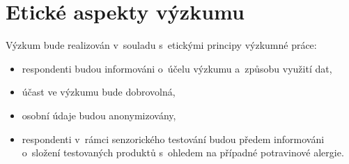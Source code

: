 \section{Etické aspekty výzkumu}
\label{sec:meth_ethics}

Výzkum bude realizován v~souladu s~etickými principy výzkumné práce:
\begin{itemize}
  \item respondenti budou informováni o~účelu výzkumu a~způsobu využití dat,
  \item účast ve výzkumu bude dobrovolná,
  \item osobní údaje budou anonymizovány,
  \item respondenti v~rámci senzorického testování budou předem informováni o~složení testovaných produktů s~ohledem na případné potravinové alergie.
\end{itemize}
